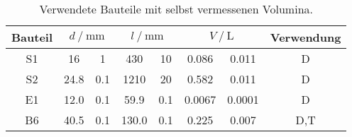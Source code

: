 \begin{table}
    \centering
    \caption{Verwendete Bauteile mit selbst vermessenen Volumina.}
    \label{tab:vol2}
    \begin{tabular}{c
                    S @{${}\pm{}$} S[table-format=1.1]
                    S[table-format=4.1] @{${}\pm{}$} S
                    S[table-format=1.4] @{${}\pm{}$} S[table-format=1.4]
                    c}
    \toprule
        {Bauteil} &
         &
         &
         &
        {Verwendung} \\
    \midrule
    S1 & 16 & 1 & 430 & 10 & 0.086 & 0.011 & D \\
    S2 & 24.8 & 0.1 & 1210 & 20 & 0.582 & 0.011 & D \\
    E1 & 12.0 & 0.1 & 59.9 & 0.1 & 0.0067 & 0.0001 & D \\
    B6 & 40.5 & 0.1 & 130.0 & 0.1 & 0.225 & 0.007 & D,T \\
    \end{tabular}
\end{table}
